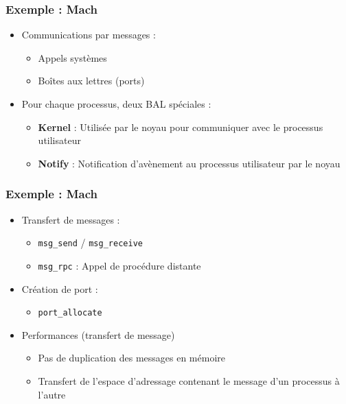 \begin{frame}
\frametitle{Exemple : Mach}
\begin{itemize}
\item Communications par messages :
\begin{itemize}
\item Appels systèmes
\item Boîtes aux lettres (ports)
\end{itemize}
\item Pour chaque processus, deux BAL spéciales :
\begin{itemize}
\item \textbf{Kernel} : Utilisée par le noyau pour communiquer avec le processus utilisateur
\item \textbf{Notify} : Notification d’avènement au processus utilisateur par le noyau
\end{itemize}
\end{itemize}
\end{frame}

\begin{frame}
\frametitle{Exemple : Mach}
\begin{itemize}
\item Transfert de messages :
\begin{itemize}
\item \texttt{msg\_send} / \texttt{msg\_receive}
\item \texttt{msg\_rpc} : Appel de procédure distante
\end{itemize}
\item Création de port :
\begin{itemize}
\item \texttt{port\_allocate}
\end{itemize}
\item Performances (transfert de message)
\begin{itemize}
\item Pas de duplication des messages en mémoire
\item Transfert de l’espace d’adressage contenant le message d’un processus à l’autre
\end{itemize}
\end{itemize}
\end{frame}

